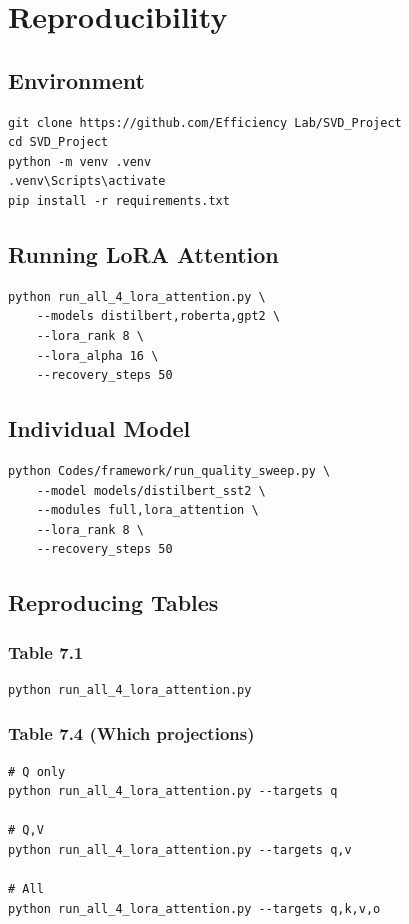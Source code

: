 \section{Reproducibility}

\subsection{Environment}

\begin{lstlisting}
git clone https://github.com/Efficiency Lab/SVD_Project
cd SVD_Project
python -m venv .venv
.venv\Scripts\activate
pip install -r requirements.txt
\end{lstlisting}

\subsection{Running LoRA Attention}

\begin{lstlisting}
python run_all_4_lora_attention.py \
    --models distilbert,roberta,gpt2 \
    --lora_rank 8 \
    --lora_alpha 16 \
    --recovery_steps 50
\end{lstlisting}

\subsection{Individual Model}

\begin{lstlisting}
python Codes/framework/run_quality_sweep.py \
    --model models/distilbert_sst2 \
    --modules full,lora_attention \
    --lora_rank 8 \
    --recovery_steps 50
\end{lstlisting}

\subsection{Reproducing Tables}

\subsubsection{Table 7.1}
\begin{lstlisting}
python run_all_4_lora_attention.py
\end{lstlisting}

\subsubsection{Table 7.4 (Which projections)}
\begin{lstlisting}
# Q only
python run_all_4_lora_attention.py --targets q

# Q,V
python run_all_4_lora_attention.py --targets q,v

# All
python run_all_4_lora_attention.py --targets q,k,v,o
\end{lstlisting}

